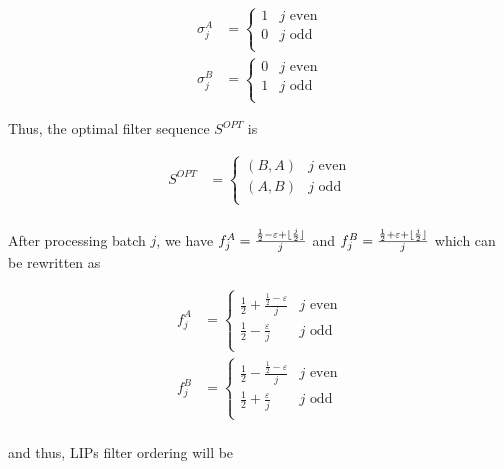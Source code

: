 \begin{align*}
\sigma_j^A &= 
    \begin{cases}
    1 & \text{$j$ even} \\[0.5em]
    0 & \text{$j$ odd} \\
    \end{cases}\\[0.5em]
\sigma_j^B &= 
    \begin{cases}
    0 & \text{$j$ even} \\[0.5em]
    1 &  \text{$j$ odd} \\
    \end{cases}
\end{align*}

Thus, the optimal filter sequence $S^{OPT}$ is 

\begin{align*}
S^{OPT} &= 
    \begin{cases}
    (B, A) & \text{$j$ even} \\[0.5em]
    (A, B) & \text{$j$ odd} \\
    \end{cases}\\[0.5em]
\end{align*}

\DeclarePairedDelimiter\floor{\lfloor}{\rfloor}
After processing batch $j$,  we have $f_j^A = \frac{\frac{1}{2} - \varepsilon + \floor{\frac{j}{2}}}{j}$ and $f_j^B = \frac{\frac{1}{2} + \varepsilon + \floor{\frac{j}{2}}}{j}$  which can be rewritten as

\begin{align*}
f_j^A &= 
    \begin{cases}
    \frac{1}{2} + \frac{\frac{1}{2}-\varepsilon}{j} & \text{$j$ even} \\[0.5em]
    \frac{1}{2} - \frac{\varepsilon}{j} &  \text{$j$ odd} \\
    \end{cases}\\[0.5em]
f_j^B &= 
    \begin{cases}
    \frac{1}{2} - \frac{\frac{1}{2}-\varepsilon}{j} & \text{$j$ even} \\[0.5em]
    \frac{1}{2} + \frac{\varepsilon}{j} &  \text{$j$ odd} \\
    \end{cases}\\[0.5em]
\end{align*}

and thus, LIPs filter ordering will be

